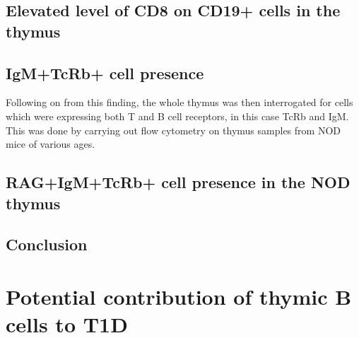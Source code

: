 \subsection{Elevated level of CD8 on CD19+ cells in the thymus}

\subsection{IgM+TcRb+ cell presence}
Following on from this finding, the whole thymus was then interrogated for cells which were expressing both T and B cell receptors, in this case TcRb and IgM. 
This was done by carrying out flow cytometry on thymus samples from NOD mice of various ages.



\subsection{RAG+IgM+TcRb+ cell presence in the NOD thymus}

\subsection{Conclusion}




\section{Potential contribution of thymic B cells to T1D}

